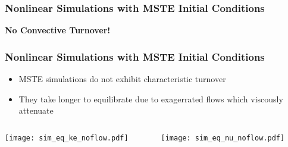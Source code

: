 \begin{frame}
    \frametitle{Nonlinear Simulations with MSTE Initial Conditions}
    \begin{center}
        \textbf{No Convective Turnover!}
        \vfill

        {}        
    \end{center}

\end{frame}
\begin{frame}[fragile]
    \frametitle{Nonlinear Simulations with MSTE Initial Conditions}
    \begin{itemize}
        \item MSTE simulations do not exhibit characteristic turnover\newline
        
        \item They take longer to equilibrate due to exagerrated flows which viscously attenuate
        
    \end{itemize}
    \begin{columns}[T]
        \begin{column}{.3\textwidth}
            {\texttt{[image: sim\_eq\_ke\_noflow.pdf]}}
        \end{column}
        \begin{column}{.3\textwidth}
            {\texttt{[image: sim\_eq\_nu\_noflow.pdf]}}
        \end{column}
    \end{columns}
\end{frame}
